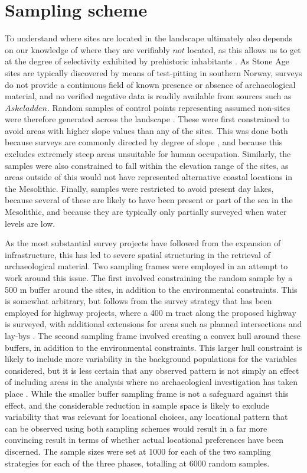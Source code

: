 \documentclass[12pt, a4paper]{article}
\begin{document}
\section{Sampling scheme}
To understand where sites are located in the landscape ultimately also depends on our knowledge of where they are verifiably $not$ located, as this allows us to get at the degree of selectivity exhibited by prehistoric inhabitants \citep[][2]{jochim1989}. As Stone Age sites are typically discovered by means of test-pitting in southern Norway, surveys do not provide a continuous field of known presence or absence of archaeological material, and no verified negative data is readily available from sources such as $Askeladden$. Random samples of control points representing assumed non-sites were therefore generated across the landscape \citep[e.g.][]{kvamme1988, fisher1997}. These were first constrained to avoid areas with higher slope values than any of the sites. This was done both because surveys are commonly directed by degree of slope \citep[e.g.][369]{nielsen2016}, and because this excludes extremely steep areas unsuitable for human occupation. Similarly, the samples were also constrained to fall within the elevation range of the sites, as areas outside of this would not have represented alternative coastal locations in the Mesolithic. Finally, samples were restricted to avoid present day lakes, because several of these are likely to have been present or part of the sea in the Mesolithic, and because they are typically only partially surveyed when water levels are low.\par     
As the most substantial survey projects have followed from the expansion of infrastructure, this has led to severe spatial structuring in the retrieval of archaeological material. Two sampling frames were employed in an attempt to work around this issue. The first involved constraining the random sample by a 500 m buffer around the sites, in addition to the environmental constraints. This is somewhat arbitrary, but follows from the survey strategy that has been employed for highway projects, where a 400 m tract along the proposed highway is surveyed, with additional extensions for areas such as planned intersections and lay-bys \citep[][7]{eskeland2017}. The second sampling frame involved creating a convex hull around these buffers, in addition to the environmental constraints. This larger hull constraint is likely to include more variability in the background populations for the variables considered, but it is less certain that any observed pattern is not simply an effect of including areas in the analysis where no archaeological investigation has taken place \citep[cf.][217]{kvamme2020}. While the smaller buffer sampling frame is not a safeguard against this effect, and the considerable reduction in sample space is likely to exclude variability that was relevant for locational choices, any locational pattern that can be observed using both sampling schemes would result in a far more convincing result in terms of whether actual locational preferences have been discerned. The sample sizes were set at 1000 for each of the two sampling strategies for each of the three phases, totalling at 6000 random samples.\par
\end{document}
